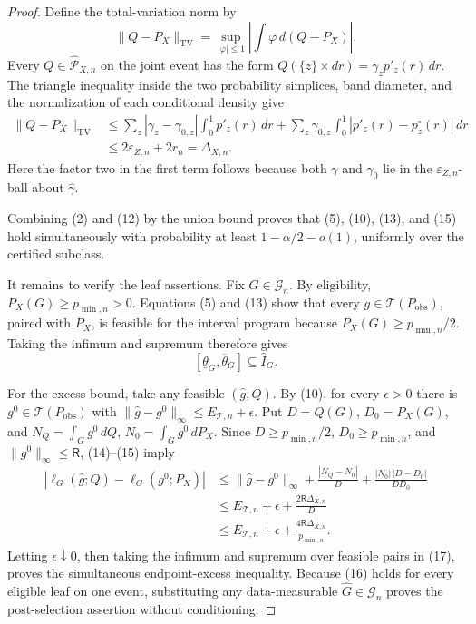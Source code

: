 \documentclass{article}
\begin{document}
\begin{proof}
Define the total-variation norm by
\[
\|Q-P_X\|_{\mathrm{TV}}
=\sup_{|\varphi|\leq1}\left|\int\varphi\,d(Q-P_X)\right|.
\tag{14}
\]
Every \(Q\in\widehat{\mathcal P}_{X,n}\) on the joint event has the form \(Q(\{z\}\times dr)=\gamma_zp'_z(r)\,dr\).  The triangle inequality inside the two probability simplices, band diameter, and the normalization of each conditional density give
\[
\begin{aligned}
\|Q-P_X\|_{\mathrm{TV}}
&\leq\sum_z|\gamma_z-\gamma_{0,z}|\int_0^1p'_z(r)\,dr
+\sum_z\gamma_{0,z}\int_0^1|p'_z(r)-p^\circ_z(r)|\,dr\\
&\leq2\varepsilon_{Z,n}+2r_n
=\Delta_{X,n}.
\end{aligned}
\tag{15}
\]
Here the factor two in the first term follows because both \(\gamma\) and \(\gamma_0\) lie in the \(\varepsilon_{Z,n}\)-ball about \(\widehat\gamma\).

Combining (2) and (12) by the union bound proves that (5), (10), (13), and (15) hold simultaneously with probability at least \(1-\alpha/2-o(1)\), uniformly over the certified subclass.

It remains to verify the leaf assertions.  Fix \(G\in\mathcal G_n\).  By eligibility, \(P_X(G)\geq p_{\min,n}>0\).  Equations (5) and (13) show that every \(g\in\mathcal T(P_{\mathrm{obs}})\), paired with \(P_X\), is feasible for the interval program because \(P_X(G)\geq p_{\min,n}/2\).  Taking the infimum and supremum therefore gives
\[
[\underline\theta_G,\overline\theta_G]\subseteq\widehat I_G.
\tag{16}
\]

For the excess bound, take any feasible \((\widehat g,Q)\).  By (10), for every \(\epsilon>0\) there is \(g^0\in\mathcal T(P_{\mathrm{obs}})\) with \(\|\widehat g-g^0\|_\infty\leq E_{\mathcal T,n}+\epsilon\).  Put \(D=Q(G)\), \(D_0=P_X(G)\), and \(N_Q=\int_Gg^0\,dQ\), \(N_0=\int_Gg^0\,dP_X\).  Since \(D\geq p_{\min,n}/2\), \(D_0\geq p_{\min,n}\), and \(\|g^0\|_\infty\leq\mathsf R\), (14)--(15) imply
\[
\begin{aligned}
|\ell_G(\widehat g;Q)-\ell_G(g^0;P_X)|
&\leq\|\widehat g-g^0\|_\infty
+\frac{|N_Q-N_0|}{D}
+\frac{|N_0|\,|D-D_0|}{DD_0}\\
&\leq E_{\mathcal T,n}+\epsilon
+\frac{2\mathsf R\Delta_{X,n}}{D}\\
&\leq E_{\mathcal T,n}+\epsilon
+\frac{4\mathsf R\Delta_{X,n}}{p_{\min,n}}.
\end{aligned}
\tag{17}
\]
Letting \(\epsilon\downarrow0\), then taking the infimum and supremum over feasible pairs in (17), proves the simultaneous endpoint-excess inequality.  Because (16) holds for every eligible leaf on one event, substituting any data-measurable \(\widehat G\in\mathcal G_n\) proves the post-selection assertion without conditioning.


\end{proof}
\end{document}
